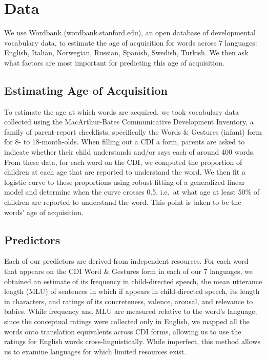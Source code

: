 \documentclass[10pt, letterpaper]{article}
\begin{document}
\section{Data}\label{data}

We use Wordbank (wordbank.stanford.edu), an open database of
developmental vocabulary data, to estimate the age of acquisition for
words across 7 languages: English, Italian, Norwegian, Russian, Spanish,
Swedish, Turkish. We then ask what factors are most important for
predicting this age of acquisition.

\subsection{Estimating Age of
Acquisition}\label{estimating-age-of-acquisition}

To estimate the age at which words are acquired, we took vocabulary data
collected using the MacArthur-Bates Communicative Development Inventory,
a family of parent-report checklists, specifically the Words \& Gestures
(infant) form for 8- to 18-month-olds. When filling out a CDI a form,
parents are asked to indicate whether their child understands and/or
says each of around 400 words. From these data, for each word on the
CDI, we computed the proportion of children at each age that are
reported to understand the word. We then fit a logistic curve to these
proportions using robust fitting of a generalized linear model and
determine when the curve crosses 0.5, i.e.~at what age at least 50\% of
children are reported to understand the word. This point is taken to be
the words' age of acquisition.

\subsection{Predictors}\label{predictors}

Each of our predictors are derived from independent resources. For each
word that appears on the CDI Word \& Gestures form in each of our 7
languages, we obtained an estimate of its frequency in child-directed
speech, the mean utterance length (MLU) of sentences in which if appears
in child-directed speech, its length in characters, and ratings of its
concreteness, valence, arousal, and relevance to babies. While frequency
and MLU are measured relative to the word's language, since the
conceptual ratings were collected only in English, we mapped all the
words onto translation equivalents across CDI forms, allowing us to use
the ratings for English words cross-linguistically. While imperfect,
this method allows us to examine languages for which limited resources
exist.
\end{document}
